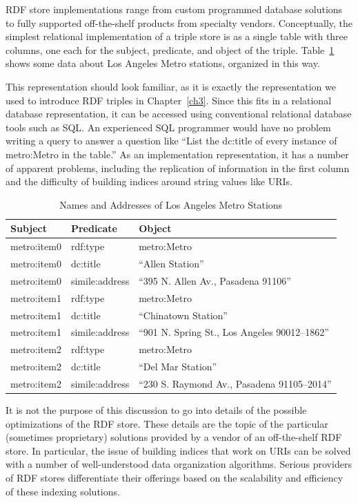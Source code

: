RDF store implementations range from custom programmed database
solutions to fully supported off-the-shelf products from specialty
vendors. Conceptually, the simplest relational implementation of a
triple store is as a single table with three columns, one each for the
subject, predicate, and object of the triple. Table~\ref{tab:ch3.14} shows some data
about Los Angeles Metro stations, organized in this way.

This representation should look familiar, as it is exactly the
representation we used to introduce
RDF triples in Chapter~\ref{ch3}. Since this fits in a relational database
representation, it can be accessed using conventional relational
database tools such as SQL. An experienced SQL programmer would have no
problem writing a query to answer a question like ``List the dc:title of
every instance of metro:Metro in the table.'' As an implementation
representation, it has a number of apparent problems, including the replication of information in the first column
and the difficulty of building indices around string values like URIs.

\begin{table}[h]
\centering
\begin{tabular}{||l l l ||} 
 \hline
 Subject&Predicate&Object \\ [0.5ex] 
 \hline\hline
metro:item0&rdf:type&metro:Metro \\
metro:item0&dc:title&``Allen Station'' \\
metro:item0&simile:address&``395 N. Allen Av., Pasadena 91106'' \\
metro:item1&rdf:type&metro:Metro \\
metro:item1&dc:title&``Chinatown Station'' \\
metro:item1&simile:address&``901 N. Spring St., Los Angeles 90012--1862'' \\
metro:item2&rdf:type&metro:Metro \\
metro:item2&dc:title&``Del Mar Station'' \\
metro:item2&simile:address&``230 S. Raymond Av., Pasadena 91105--2014'' \\
\hline
\end{tabular}
\caption{Names and Addresses of Los Angeles Metro Stations}
\label{tab:ch3.14}
\end{table}





It is not the purpose of this discussion to go into details of the
possible optimizations of the RDF store. These details are the topic of
the particular (sometimes proprietary) solutions provided by a vendor of
an off-the-shelf RDF store. In particular, the issue of building indices
that work on URIs can be solved with a number of well-understood data
organization algorithms. Serious providers of RDF stores differentiate
their offerings based on the scalability and efficiency of these
indexing solutions.


